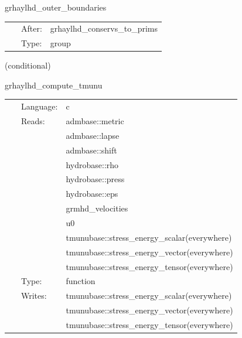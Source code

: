 \vspace{5mm}


\hspace{5mm} grhaylhd\_outer\_boundaries 

\hspace{5mm}{\it apply selected boundary conditions to the primitive variables } 


\hspace{5mm}

 \begin{tabular*}{160mm}{cll} 
~ & After:  & grhaylhd\_conservs\_to\_prims \\ 
~ & Type:  & group \\ 
\end{tabular*} 


\vspace{5mm}

   (conditional) 

\hspace{5mm} grhaylhd\_compute\_tmunu 

\hspace{5mm}{\it compute stress-energy tensor } 


\hspace{5mm}

 \begin{tabular*}{160mm}{cll} 
~ & Language:  & c \\ 
~ & Reads:  & admbase::metric \\ 
~& ~ &admbase::lapse\\ 
~& ~ &admbase::shift\\ 
~& ~ &hydrobase::rho\\ 
~& ~ &hydrobase::press\\ 
~& ~ &hydrobase::eps\\ 
~& ~ &grmhd\_velocities\\ 
~& ~ &u0\\ 
~& ~ &tmunubase::stress\_energy\_scalar(everywhere)\\ 
~& ~ &tmunubase::stress\_energy\_vector(everywhere)\\ 
~& ~ &tmunubase::stress\_energy\_tensor(everywhere)\\ 
~ & Type:  & function \\ 
~ & Writes:  & tmunubase::stress\_energy\_scalar(everywhere) \\ 
~& ~ &tmunubase::stress\_energy\_vector(everywhere)\\ 
~& ~ &tmunubase::stress\_energy\_tensor(everywhere)\\ 
\end{tabular*} 


